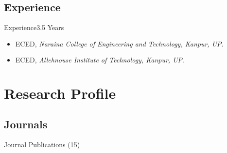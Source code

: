 \subsection{Experience}
\begin{frame}{Experience}{3.5 Years}
\small{
\begin{itemize}
\item{}  \newline
ECED, {\sl Naraina College of Engineering and Technology, Kanpur, UP}.
\item{} \newline
ECED, {\sl Allehnouse Institute of Technology, Kanpur, UP}.
\end{itemize}
}
\end{frame}


\section{Research Profile}
\subsection{Journals}
\begin{frame}[allowframebreaks]{Journal Publications (15)}{}

\begin{small}
   \begin{enumerate}[label={\textbf{[\arabic*]}\ }]
\item {}
\item {}
\item {}
\item {}
\item {}
\item {}
\item {}
\item {}
\item {}
\item {}
\item {}
\item {}
\item {}
\item {}
\item {}
  \end{enumerate}  
  \end{small}
\end{frame}




